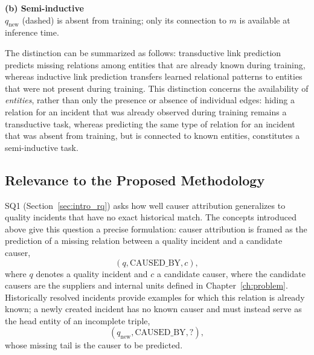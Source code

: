 \begin{minipage}{\textwidth}
\begin{minipage}{0.47\textwidth}
  \vspace{2mm}
  \textbf{(b) Semi-inductive}\\
  \footnotesize $q_{\text{new}}$ (dashed) is absent from training; only
  its connection to $m$ is available at inference time.
\end{minipage}
\captionsetup{type=figure}
\label{fig:transductive_inductive}
\end{minipage}
\vspace{\baselineskip}

The distinction can be summarized as follows: transductive link
prediction predicts missing relations among entities that are already
known during training, whereas inductive link prediction transfers
learned relational patterns to entities that were not present during
training. This distinction concerns the availability of \emph{entities},
rather than only the presence or absence of individual edges: hiding a
relation for an incident that was already observed during training
remains a transductive task, whereas predicting the same type of relation
for an incident that was absent from training, but is connected to known
entities, constitutes a semi-inductive task.

\subsection{Relevance to the Proposed Methodology}\label{sec:fund_kg_relevance}

SQ1 (Section~\ref{sec:intro_rq}) asks how well causer attribution
generalizes to quality incidents that have no exact historical match. The
concepts introduced above give this question a precise formulation:
causer attribution is framed as the prediction of a missing relation
between a quality incident and a candidate causer,
\[
  (q, \text{CAUSED\_BY}, c),
\]
where $q$ denotes a quality incident and $c$ a candidate causer, where the
candidate causers are the suppliers and internal units defined in
Chapter~\ref{ch:problem}. Historically resolved incidents provide examples
for which this relation is already known; a newly created incident has no
known causer and must instead serve as the head entity of an incomplete
triple,
\[
  (q_{\text{new}}, \text{CAUSED\_BY}, ?),
\]
whose missing tail is the causer to be predicted.

